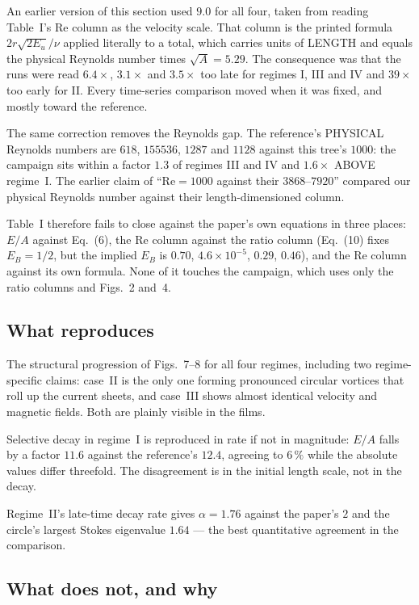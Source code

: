 \documentclass[11pt,a4paper]{article}
\begin{document}
An earlier version of this section used $9.0$ for all four, taken from reading
Table~I's $\mathrm{Re}$ column as the velocity scale. That column is the printed
formula $2r\sqrt{2E_u}/\nu$ applied literally to a total, which carries units of
LENGTH and equals the physical Reynolds number times $\sqrt{A}=5.29$. The
consequence was that the runs were read $6.4\times$, $3.1\times$ and $3.5\times$
too late for regimes I, III and IV and $39\times$ too early for II. Every
time-series comparison moved when it was fixed, and mostly toward the reference.

The same correction removes the Reynolds gap. The reference's PHYSICAL Reynolds
numbers are $618$, $155536$, $1287$ and $1128$ against this tree's $1000$: the
campaign sits within a factor $1.3$ of regimes III and IV and $1.6\times$ ABOVE
regime~I. The earlier claim of ``$\mathrm{Re}=1000$ against their $3868$--$7920$''
compared our physical Reynolds number against their length-dimensioned column.

Table~I therefore fails to close against the paper's own equations in three
places: $E/A$ against Eq.~(6), the $\mathrm{Re}$ column against the ratio column
(Eq.~(10) fixes $E_B=1/2$, but the implied $E_B$ is $0.70$, $4.6\times10^{-5}$,
$0.29$, $0.46$), and the $\mathrm{Re}$ column against its own formula. None of it
touches the campaign, which uses only the ratio columns and Figs.~2 and~4.

\subsection{What reproduces}

The structural progression of Figs.~7--8 for all four regimes, including two
regime-specific claims: case~II is the only one forming pronounced circular
vortices that roll up the current sheets, and case~III shows almost identical
velocity and magnetic fields. Both are plainly visible in the films.

Selective decay in regime~I is reproduced in rate if not in magnitude: $E/A$
falls by a factor $11.6$ against the reference's $12.4$, agreeing to $6\,\%$
while the absolute values differ threefold. The disagreement is in the initial
length scale, not in the decay.

Regime~II's late-time decay rate gives $\alpha=1.76$ against the paper's $2$ and
the circle's largest Stokes eigenvalue $1.64$ --- the best quantitative agreement
in the comparison.

\subsection{What does not, and why}
\end{document}
